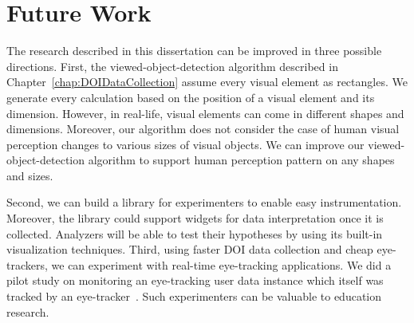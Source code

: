 \section{Future Work}
The research described in this dissertation can be improved in three possible directions. First, the viewed-object-detection algorithm described in Chapter~\ref{chap:DOIDataCollection} assume every visual element as rectangles. We generate every calculation based on the position of a visual element and its dimension. However, in real-life, visual elements can come in different shapes and dimensions. Moreover, our algorithm does not consider the case of human visual perception changes to various sizes of visual objects. We can improve our viewed-object-detection algorithm to support human perception pattern on any shapes and sizes. 

Second, we can build a library for experimenters to enable easy instrumentation. Moreover, the library could support widgets for data interpretation once it is collected. Analyzers will be able to test their hypotheses by using its built-in visualization techniques. Third, using faster DOI data collection and cheap eye-trackers, we can experiment with real-time eye-tracking applications. We did a pilot study on monitoring an eye-tracking user data instance which itself was tracked by an eye-tracker~\cite{alam2015they}. Such experimenters can be valuable to education research. 